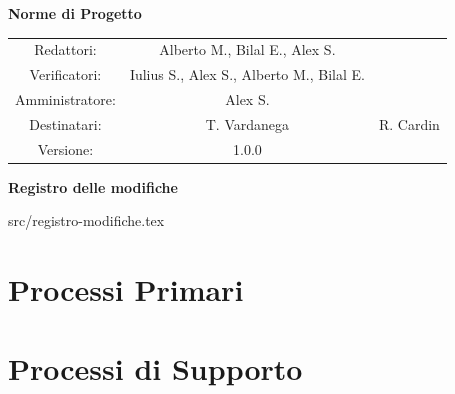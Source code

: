 \documentclass[a4paper, 11pt]{article}
\begin{document}
\begin{center}
\begin{Huge}
        \textbf{Norme di Progetto} \\
        \vspace{4mm}

\end{Huge}

\vspace{20mm}

\begin{large}
\begin{spacing}{1.4}
\begin{tabular}{c c c}
   Redattori: & Alberto M., Bilal E., Alex S. & \\
   Verificatori: & Iulius S., Alex S., Alberto M., Bilal E. & \\
   Amministratore: & Alex S. & \\
   Destinatari: & T. Vardanega & R. Cardin \\
   Versione: & 1.0.0 &
\end{tabular}
\end{spacing}
\end{large}
\end{center}

\pagebreak

\begin{huge}
    \textbf{Registro delle modifiche}
\end{huge}
\vspace{5pt}

 {src/registro-modifiche.tex}

\pagebreak
\tableofcontents
\pagebreak


\pagebreak

\section{Processi Primari}










\pagebreak

\section{Processi di Supporto}
\end{document}
